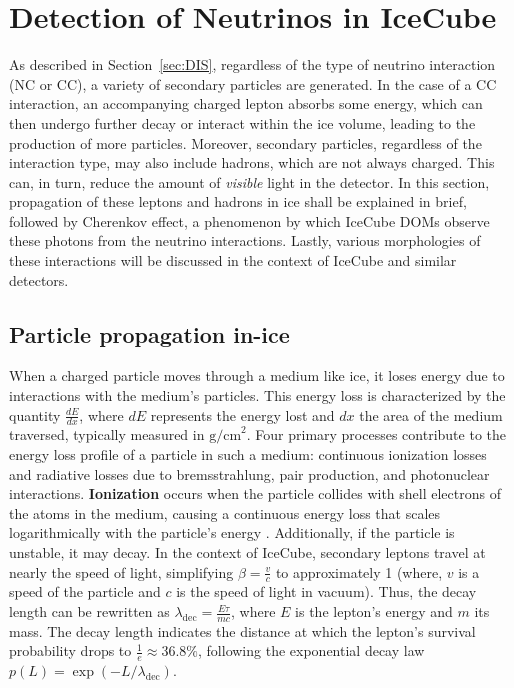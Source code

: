 \section{Detection of Neutrinos in IceCube}
\label{sec:nu_detcetion_ic}
As described in Section~\ref{sec:DIS}, regardless of the type of neutrino interaction (NC or CC), a variety of secondary particles are generated. In the case of a CC interaction, an accompanying charged lepton absorbs some energy, which can then undergo further decay or interact within the ice volume, leading to the production of more particles. Moreover, secondary particles, regardless of the interaction type, may also include hadrons, which are not always charged. This can, in turn, reduce the amount of \emph{visible} light in the detector. In this section, propagation of these leptons and hadrons in ice shall be explained in brief, followed by Cherenkov effect, a phenomenon by which IceCube DOMs observe these photons from the neutrino interactions. Lastly, various morphologies of these interactions will be discussed in the context of IceCube and similar detectors.

\subsection{Particle propagation in-ice}
\label{sec:particle_propgation}
When a charged particle moves through a medium like ice, it loses energy due to interactions with the medium's particles. This energy loss is characterized by the quantity $ \frac{dE}{dx} $, where $ dE $ represents the energy lost and $ dx $ the area of the medium traversed, typically measured in $\text{g/cm}^2$. Four primary processes contribute to the energy loss profile of a particle in such a medium: continuous ionization losses and radiative losses due to bremsstrahlung, pair production, and photonuclear interactions. \textbf{Ionization} occurs when the particle collides with shell electrons of the atoms in the medium, causing a continuous energy loss that scales logarithmically with the particle's energy . Additionally, if the particle is unstable, it may decay. In the context of IceCube, secondary leptons travel at nearly the speed of light, simplifying $ \beta = \frac{v}{c}$ to approximately 1 (where, $v$ is a speed of the particle and $c$ is the speed of light in vacuum). Thus, the decay length can be rewritten as $ \lambda_{\text{dec}} = \frac{E\tau}{mc} $, where $ E $ is the lepton's energy and $ m $ its mass. The decay length indicates the distance at which the lepton's survival probability drops to $ \frac{1}{e} \approx 36.8\% $, following the exponential decay law $ p(L) = \exp(-L/\lambda_{\text{dec}}) $.

